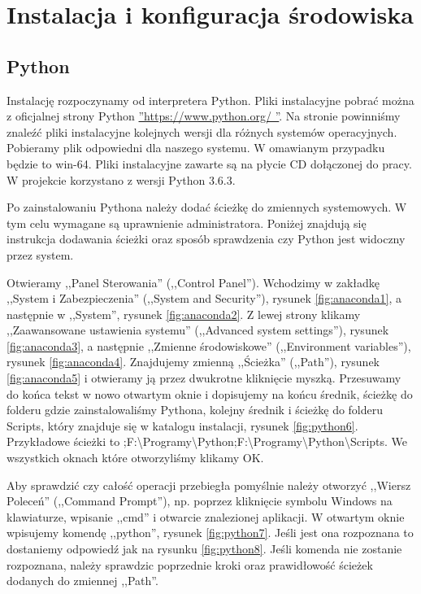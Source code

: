 \section{Instalacja i konfiguracja środowiska}
\label{sec:instalacja}

\subsection{Python}
\label{sec:anaconda}

Instalację rozpoczynamy od interpretera Python. Pliki instalacyjne pobrać można z oficjalnej strony Python \hyperref[python]{''https://www.python.org/ ''}. Na stronie powinniśmy znaleźć pliki instalacyjne kolejnych wersji dla różnych systemów operacyjnych. Pobieramy plik odpowiedni dla naszego systemu. W omawianym przypadku będzie to win-64. Pliki instalacyjne zawarte są na płycie CD dołączonej do pracy. W projekcie korzystano z wersji Python 3.6.3.

Po zainstalowaniu Pythona należy dodać ścieżkę do zmiennych systemowych. W tym celu wymagane są uprawnienie administratora. Poniżej znajdują się instrukcja dodawania ścieżki oraz sposób sprawdzenia czy Python jest widoczny przez system.

Otwieramy ,,Panel Sterowania'' (,,Control Panel''). Wchodzimy w zakładkę ,,System i Zabezpieczenia'' (,,System and Security''), rysunek \ref{fig:anaconda1}, a następnie w ,,System'', rysunek \ref{fig:anaconda2}. Z lewej strony klikamy ,,Zaawansowane ustawienia systemu'' (,,Advanced system settings''), rysunek \ref{fig:anaconda3}, a następnie
,,Zmienne środowiskowe'' (,,Environment variables''), rysunek \ref{fig:anaconda4}. Znajdujemy zmienną ,,Ścieżka'' (,,Path''), rysunek \ref{fig:anaconda5} i otwieramy ją przez dwukrotne kliknięcie myszką. Przesuwamy do końca tekst w nowo otwartym oknie i dopisujemy na końcu średnik, ścieżkę do folderu gdzie zainstalowaliśmy Pythona, kolejny średnik i ścieżkę do folderu Scripts, który znajduje się w katalogu instalacji, rysunek \ref{fig:python6}. Przykładowe ścieżki to ;F:\textbackslash Programy\textbackslash Python;F:\textbackslash Programy\textbackslash Python\textbackslash Scripts. We wszystkich oknach które otworzyliśmy klikamy OK.

Aby sprawdzić czy całość operacji przebiegła pomyślnie należy otworzyć ,,Wiersz Poleceń'' (,,Command Prompt''), np. poprzez kliknięcie symbolu Windows na klawiaturze, wpisanie ,,cmd'' i otwarcie znalezionej aplikacji. W otwartym oknie wpisujemy komendę ,,python'', rysunek \ref{fig:python7}.  Jeśli jest ona rozpoznana to dostaniemy odpowiedź jak na rysunku \ref{fig:python8}. Jeśli komenda nie zostanie rozpoznana, należy sprawdzic poprzednie kroki oraz prawidłowość ścieżek dodanych do zmiennej ,,Path''.

